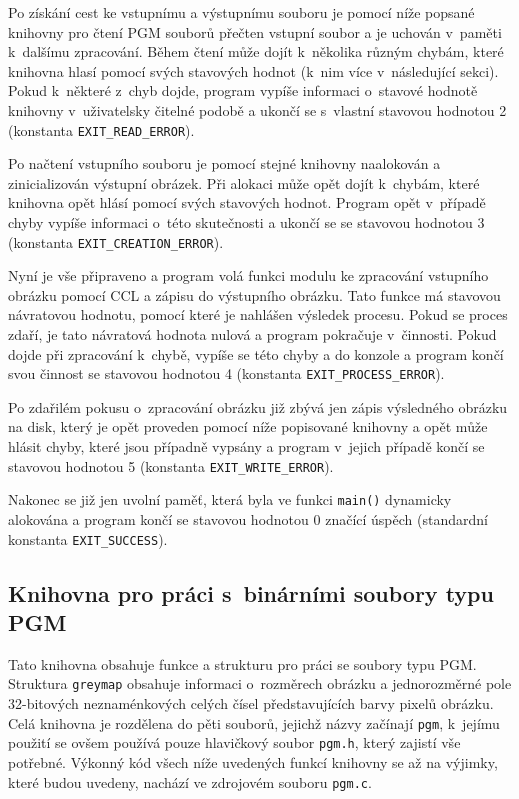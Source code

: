 Po získání cest ke vstupnímu a výstupnímu souboru je pomocí níže popsané knihovny pro čtení PGM souborů přečten vstupní
soubor a je uchován v~paměti k~dalšímu zpracování. Během čtení může dojít k~několika různým chybám, které knihovna hlasí
pomocí svých stavových hodnot (k~nim více v~následující sekci). Pokud k~některé z~chyb dojde, program vypíše informaci
o~stavové hodnotě knihovny v~uživatelsky čitelné podobě a ukončí se s~vlastní stavovou hodnotou 2 (konstanta
\verb|EXIT_READ_ERROR|).

Po načtení vstupního souboru je pomocí stejné knihovny naalokován a zinicializován výstupní obrázek. Při alokaci může
opět dojít k~chybám, které knihovna opět hlásí pomocí svých stavových hodnot. Program opět v~případě chyby vypíše
informaci o~této skutečnosti a ukončí se se stavovou hodnotou 3 (konstanta \verb|EXIT_CREATION_ERROR|).

Nyní je vše připraveno a program volá funkci modulu ke zpracování vstupního obrázku pomocí CCL a zápisu do výstupního
obrázku. Tato funkce má stavovou návratovou hodnotu, pomocí které je nahlášen výsledek procesu. Pokud se proces zdaří,
je tato návratová hodnota nulová a program pokračuje v~činnosti. Pokud dojde při zpracování k~chybě, vypíše se této
chyby a do konzole a program končí svou činnost se stavovou hodnotou 4 (konstanta \verb|EXIT_PROCESS_ERROR|).

Po zdařilém pokusu o~zpracování obrázku již zbývá jen zápis výsledného obrázku na disk, který je opět proveden pomocí
níže popisované knihovny a opět může hlásit chyby, které jsou případně vypsány a program v~jejich případě končí se
stavovou hodnotou 5 (konstanta \verb|EXIT_WRITE_ERROR|).

Nakonec se již jen uvolní paměť, která byla ve funkci \verb|main()| dynamicky alokována a program končí se stavovou
hodnotou 0 značící úspěch (standardní konstanta \verb|EXIT_SUCCESS|).


\subsection[Knihovna pro práci s~PGM]{Knihovna pro práci s~binárními soubory typu PGM}

Tato knihovna obsahuje funkce a strukturu pro práci se soubory typu PGM. Struktura \verb|greymap| obsahuje informaci
o~rozměrech obrázku a jednorozměrné pole 32-bitových neznaménkových celých čísel představujících barvy pixelů obrázku.
Celá knihovna je rozdělena do pěti souborů, jejichž názvy začínají \verb|pgm|, k~jejímu použití se ovšem používá pouze
hlavičkový soubor \verb|pgm.h|, který zajistí vše potřebné. Výkonný kód všech níže uvedených funkcí knihovny se až
na výjimky, které budou uvedeny, nachází ve zdrojovém souboru \verb|pgm.c|.

